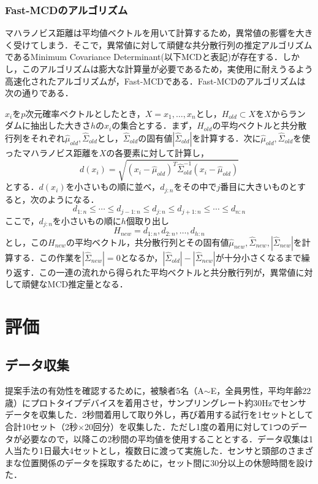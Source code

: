 \documentclass[Japanese]{dicomopapers}
\begin{document}
\subsubsection{Fast-MCDのアルゴリズム}
マハラノビス距離は平均値ベクトルを用いて計算するため，異常値の影響を大きく受けてしまう．そこで，異常値に対して頑健な共分散行列の推定アルゴリズムであるMinimum Covariance Determinant(以下MCDと表記)が存在する．しかし，このアルゴリズムは膨大な計算量が必要であるため，実使用に耐えうるよう高速化されたアルゴリズムが，Fast-MCDである．Fast-MCDのアルゴリズムは次の通りである．\par
$x_i$を$p$次元確率ベクトルとしたとき，$X = {x_1, \ldots, x_n}$とし，$H_{old}\subset X$を$X$からランダムに抽出した大きさ$h$の$x_i$の集合とする．まず，$H_{old}$の平均ベクトルと共分散行列をそれぞれ$\hat{\mu}_{old}, \hat{\Sigma}_{old}$とし，$\hat{\Sigma}_{old}$の固有値$|\hat{\Sigma}_{old}|$を計算する．次に$\hat{\mu}_{old}, \hat{\Sigma}_{old}$を使ったマハラノビス距離を$X$の各要素に対して計算し，
\[
d(x_i) = \sqrt{(x_i-\hat{\mu}_{old})^{T}\hat{\Sigma}_{old}^{-1}(x_i-\hat{\mu}_{old})}
\]
とする．$d(x_i)$を小さいもの順に並べ，$d_{j:n}$をその中で$j$番目に大きいものとすると，次のようになる．
\[
d_{1:n}\leq \cdots\leq d_{j-1:n}\leq d_{j:n}\leq d_{j+1:n}\leq \cdots\leq d_{n:n}
\]
ここで，$d_{j:n}$を小さいもの順に$h$個取り出し
\[
H_{new} = {d_{1:n}, d_{2:n}, \ldots, d_{h:n}}
\]
とし，この$H_{new}$の平均ベクトル，共分散行列とその固有値$\hat{\mu}_{new}, \hat{\Sigma}_{new}, |\hat{\Sigma}_{new}|$を計算する．この作業を$|\hat{\Sigma}_{new}|=0$となるか，$|\hat{\Sigma}_{old}|-|\hat{\Sigma}_{new}|$が十分小さくなるまで繰り返す．この一連の流れから得られた平均ベクトルと共分散行列が，異常値に対して頑健なMCD推定量となる．

\section{評価}
\subsection{データ収集}
提案手法の有効性を確認するために，被験者5名（A$\sim$E，全員男性，平均年齢22歳）にプロトタイプデバイスを着用させ，サンプリングレート約30Hzでセンサデータを収集した．2秒間着用して取り外し，再び着用する試行を1セットとして合計10セット（2秒$\times$20回分）を収集した．ただし1度の着用に対して1つのデータが必要なので，以降この2秒間の平均値を使用することとする．データ収集は1人当たり1日最大4セットとし，複数日に渡って実施した．センサと頭部のさまざまな位置関係のデータを採取するために，セット間に30分以上の休憩時間を設けた．
\end{document}
